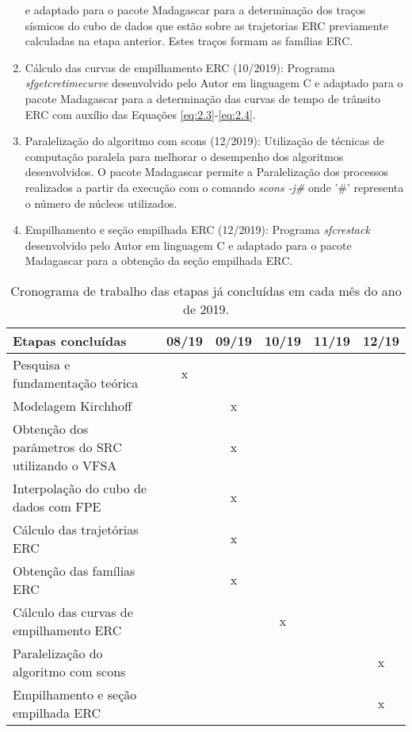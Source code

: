 \begin{enumerate}
     e adaptado para o pacote Madagascar para a
     determinação dos traços sísmicos do cubo de dados que estão sobre as trajetorias ERC previamente calculadas na etapa anterior.
     Estes traços formam as famílias ERC.
    \item  Cálculo das curvas de empilhamento ERC (10/2019): Programa \textit{sfgetcretimecurve} desenvolvido pelo Autor 
    em linguagem C e adaptado 
    para o pacote Madagascar para a determinação das curvas de tempo de trânsito ERC com auxílio das 
    Equações \ref{eq:2.3}-\ref{eq:2.4}.
     \item Paralelização do algoritmo com scons (12/2019): Utilização de técnicas de computação paralela para 
     melhorar o desempenho
     dos algoritmos desenvolvidos. O pacote Madagascar permite a Paralelização dos processos realizados a partir da execução
     com o comando \textit{scons -j\#} onde '\#' representa o número de núcleos utilizados.
    \item  Empilhamento e seção empilhada ERC (12/2019): Programa \textit{sfcrestack} 
    desenvolvido pelo Autor em linguagem C e adaptado 
    para o pacote Madagascar para a obtenção da seção  empilhada ERC.
  \end{enumerate}

    \begin{table}[H]
      \caption{Cronograma de trabalho das etapas já concluídas em cada mês do ano de 2019.}
      \centering
      
      \begin{tabular}{|p{6cm}|c|c|c|c|c|}%

     \hline
      \textbf{Etapas concluídas} & 08/19 & 09/19 & 10/19 & 11/19 & 12/19 \\ \hline
      Pesquisa e fundamentação teórica & x & & &  & \\ \hline
      Modelagem Kirchhoff & & x & &  & \\ \hline
      Obtenção dos parâmetros do SRC utilizando o VFSA & & x & &  & \\ \hline
      Interpolação do cubo de dados com FPE & & x & &  & \\ \hline
      Cálculo das trajetórias ERC & & x & &  & \\ \hline
      Obtenção das famílias ERC & & x & &  & \\ \hline
      Cálculo das curvas de empilhamento ERC & & & x & & \\ \hline
      Paralelização do algoritmo com scons & & & & & x \\ \hline
      Empilhamento e seção empilhada ERC & & & &  & x \\
      \hline
      
      \end{tabular}
  \end{table}
  
